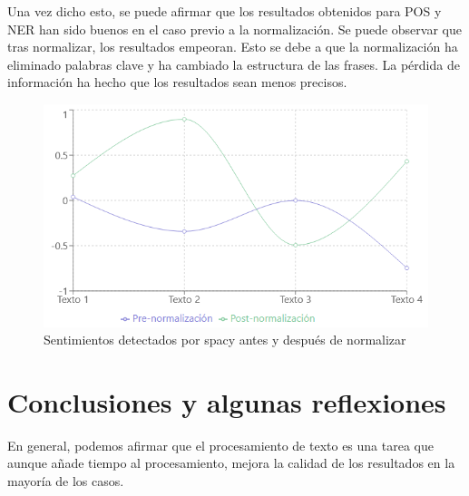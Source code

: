 \documentclass[a4paper,twocolumn]{article}
\begin{document}
    Una vez dicho esto, se puede afirmar que los resultados obtenidos para POS y NER
    han sido buenos en el caso previo a la normalización.
    Se puede observar que tras normalizar, los resultados empeoran.
    Esto se debe a que la normalización ha eliminado palabras clave y ha cambiado la estructura de las frases.
    La pérdida de información ha hecho que los resultados sean menos precisos.



    \begin{figure}
        \vspace{1.5pt}
        \centering
        \includegraphics[scale=0.25]{imagenes/nltk-sentimientos}
        \caption{Sentimientos detectados por spacy antes y después de normalizar}
        \label{fig:nltk-sentimientos}
    \end{figure}









    \section{Conclusiones y algunas reflexiones}\label{sec:conclusiones-y-algunas-reflexiones}

    En general, podemos afirmar que el procesamiento de texto es una tarea que aunque añade
    tiempo al procesamiento, mejora la calidad de los resultados en la mayoría de los casos.
\end{document}
